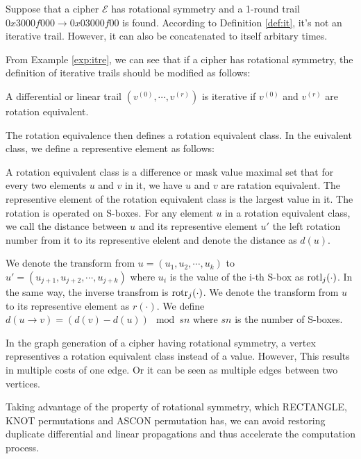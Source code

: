 \begin{example}\label{exp:itre}
	Suppose that a cipher $\mathcal{E}$ has rotational symmetry and a 1-round trail $0x3000f000\rightarrow 0x03000f00$ is found. According to Definition \ref{def:it}, it's not an iterative trail. However, it can also be concatenated to itself arbitary times.
\end{example}

From Example \ref{exp:itre}, we can see that if a cipher has rotational symmetry, the definition of iterative trails should be modified as follows:  

\begin{definition}
	A differential or linear trail $(v^{(0)},\cdots,v^{(r)})$ is iterative if $v^{(0)}$ and $v^{(r)}$ are rotation equivalent.
\end{definition}

The rotation equivalence then defines a rotation equivalent class. In the euivalent class, we define a representive element as follows:

\begin{definition}
	A rotation equivalent class is a difference or mask value maximal set that for every two elements $u$ and $v$ in it, we have $u$ and $v$ are ratation equivalent. The representive element of the rotation equivalent class is the largest value in it. The rotation is operated on S-boxes. For any element $u$ in a rotation equivalent class, we call the distance between $u$ and its representive element $u'$ the left rotation number from it to its representive elelent and denote the distance as $d(u)$. 
\end{definition}

We denote the transform from $u=(u_1,u_2,\cdots,u_k)$ to $u'=(u_{j+1},u_{j+2},\cdots,u_{j+k})$ where $u_i$ is the value of the i-th S-box as $\text{rotl}_j(\cdot)$. In the same way, the inverse transfrom is $\text{rotr}_j(\cdot)$. We denote the transform from $u$ to its representive element as $r(\cdot)$. We define $d(u\rightarrow v)=(d(v)-d(u))\mod sn$ where $sn$ is the number of S-boxes. 

In the graph generation of a cipher having rotational symmetry, a vertex representives a rotation equivalent class instead of a value. However, This results in multiple costs of one edge. Or it can be seen as multiple edges between two vertices. 

Taking advantage of the property of rotational symmetry, which RECTANGLE, KNOT permutations and ASCON permutation has, we can avoid restoring duplicate differential and linear propagations and thus accelerate the computation process. %

